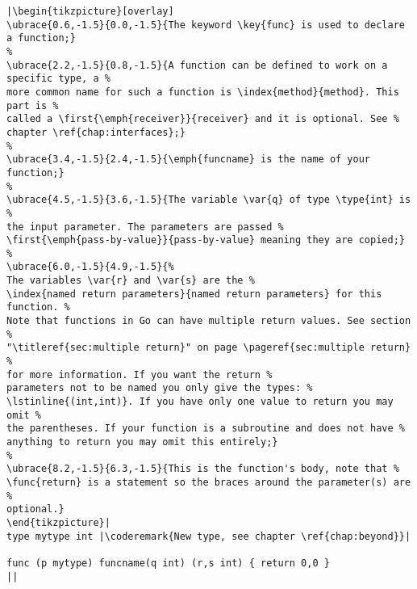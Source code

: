 \begin{lstlisting}[caption=A function declaration,label=src:function definition]
|\begin{tikzpicture}[overlay]
\ubrace{0.6,-1.5}{0.0,-1.5}{The keyword \key{func} is used to declare a function;}
%
\ubrace{2.2,-1.5}{0.8,-1.5}{A function can be defined to work on a specific type, a %
more common name for such a function is \index{method}{method}. This part is %
called a \first{\emph{receiver}}{receiver} and it is optional. See %
chapter \ref{chap:interfaces};}
%
\ubrace{3.4,-1.5}{2.4,-1.5}{\emph{funcname} is the name of your function;}
%
\ubrace{4.5,-1.5}{3.6,-1.5}{The variable \var{q} of type \type{int} is %
the input parameter. The parameters are passed %
\first{\emph{pass-by-value}}{pass-by-value} meaning they are copied;}
%
\ubrace{6.0,-1.5}{4.9,-1.5}{%
The variables \var{r} and \var{s} are the %
\index{named return parameters}{named return parameters} for this function. %
Note that functions in Go can have multiple return values. See section %
"\titleref{sec:multiple return}" on page \pageref{sec:multiple return} %
for more information. If you want the return %
parameters not to be named you only give the types: %
\lstinline{(int,int)}. If you have only one value to return you may omit %
the parentheses. If your function is a subroutine and does not have %
anything to return you may omit this entirely;}
%
\ubrace{8.2,-1.5}{6.3,-1.5}{This is the function's body, note that %
\func{return} is a statement so the braces around the parameter(s) are %
optional.}
\end{tikzpicture}|
type mytype int	|\coderemark{New type, see chapter \ref{chap:beyond}}|

func (p mytype) funcname(q int) (r,s int) { return 0,0 }
||
\end{lstlisting}
